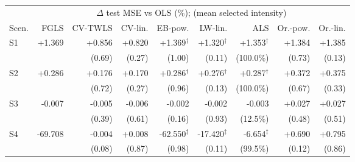 \begin{tabular}{@{}lrrrrrrrr@{}}
\toprule
 & \multicolumn{8}{c}{$\Delta$ test MSE vs OLS (\%); (mean selected intensity)} \\
\cmidrule(l){2-9}
Scen. & FGLS & CV-TWLS & CV-lin. & EB-pow. & LW-lin. & ALS & Or.-pow. & Or.-lin. \\
\midrule
S1 & +1.369 & +0.856 & +0.820 & +1.369$^{\dagger}$ & +1.320$^{\dagger}$ & +1.353$^{\dagger}$ & +1.384 & +1.385 \\
 &  & (0.69) & (0.27) & (1.00) & (0.11) & (100.0\%) & (0.73) & (0.13) \\
S2 & +0.286 & +0.176 & +0.170 & +0.286$^{\dagger}$ & +0.276$^{\dagger}$ & +0.287$^{\dagger}$ & +0.372 & +0.375 \\
 &  & (0.72) & (0.27) & (0.96) & (0.13) & (100.0\%) & (0.67) & (0.33) \\
S3 & -0.007 & -0.005 & -0.006 & -0.002 & -0.002 & -0.003 & +0.027 & +0.027 \\
 &  & (0.39) & (0.61) & (0.16) & (0.93) & (12.5\%) & (0.48) & (0.51) \\
S4 & -69.708 & -0.004 & +0.008 & -62.550$^{\ddagger}$ & -17.420$^{\ddagger}$ & -6.654$^{\ddagger}$ & +0.690 & +0.795 \\
 &  & (0.08) & (0.87) & (0.98) & (0.11) & (99.5\%) & (0.12) & (0.86) \\
\bottomrule
\end{tabular}
